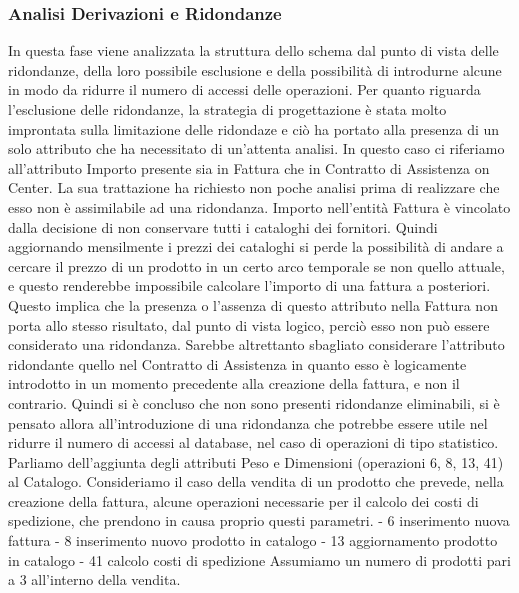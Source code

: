 
\subsubsection{Analisi Derivazioni e Ridondanze}
In questa fase viene analizzata la struttura dello schema dal punto di vista delle ridondanze, della loro possibile esclusione e della possibilità di introdurne alcune in modo da ridurre il numero di accessi delle operazioni. \newline
Per quanto riguarda l'esclusione delle ridondanze, la strategia di progettazione è stata molto improntata sulla limitazione delle ridondaze e ciò ha portato alla presenza di un solo attributo che ha necessitato di un'attenta analisi. In questo caso ci riferiamo all'attributo Importo presente sia in Fattura che in Contratto di Assistenza on Center. La sua trattazione ha richiesto non poche analisi prima di realizzare che esso non è assimilabile ad una ridondanza. Importo nell'entità Fattura è vincolato dalla decisione di non conservare tutti i cataloghi dei fornitori. Quindi aggiornando mensilmente i prezzi dei cataloghi si perde la possibilità di andare a cercare il prezzo di un prodotto in un certo arco temporale se non quello attuale, e questo renderebbe impossibile calcolare l'importo di una fattura a posteriori.\newline
Questo implica che la presenza o l'assenza di questo attributo nella Fattura non porta allo stesso risultato, dal punto di vista logico, perciò esso non può essere considerato una ridondanza. Sarebbe altrettanto sbagliato considerare l'attributo ridondante quello nel Contratto di Assistenza in quanto esso è logicamente introdotto in un momento precedente alla creazione della fattura, e non il contrario.\newline\newline
Quindi si è concluso che non sono presenti ridondanze eliminabili, si è pensato allora all'introduzione di una ridondanza che potrebbe essere utile nel ridurre il numero di accessi al database, nel caso di operazioni di tipo statistico. Parliamo dell'aggiunta degli attributi Peso e Dimensioni (operazioni 6, 8, 13, 41) al Catalogo.
Consideriamo il caso della vendita di un prodotto che prevede, nella creazione della fattura, alcune operazioni necessarie per il calcolo dei costi di spedizione, che prendono in causa proprio questi parametri.
\noindent\newline
- 6 inserimento nuova fattura\newline
- 8 inserimento nuovo prodotto in catalogo\newline
- 13 aggiornamento prodotto in catalogo\newline
- 41 calcolo costi di spedizione
\newline\newline
Assumiamo un numero di prodotti pari a 3 all'interno della vendita.
\vspace{1cm}

